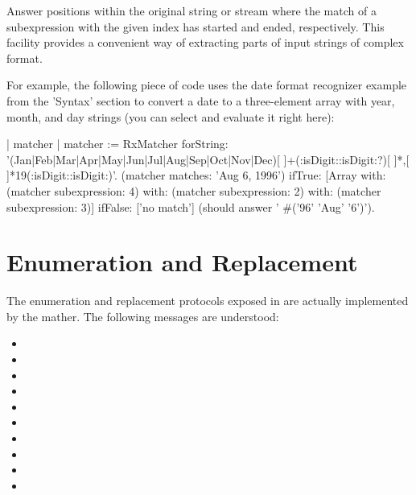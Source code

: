 \documentclass[a4paper,10pt,twoside]{book}
\begin{document}
{\begin{description}
\item {} Answer positions within the original string or stream where the 	match of a subexpression with the given index has started and ended, respectively. This facility provides a convenient way of extracting parts of input strings of complex format. 
\end{description}




For example, the following piece of code uses the  date format recognizer example from the 'Syntax' section to convert a date to a three-element array with year, month, and day strings (you can select and evaluate it right here): 	

\begin{code}{}
| matcher | 	
matcher := RxMatcher forString:  '(Jan|Feb|Mar|Apr|May|Jun|Jul|Aug|Sep|Oct|Nov|Dec)[ ]+(:isDigit::isDigit:?)[ ]*,[ ]*19(:isDigit::isDigit:)'. 	
(matcher matches: 'Aug 6, 1996') 		
       ifTrue: [Array 
                       with: (matcher subexpression: 4) 	with: (matcher subexpression: 2) 				with: (matcher subexpression: 3)] 		
        ifFalse: ['no match'] (should answer ' #('96' 'Aug' '6')'). 	
\end{code}        
        


        
\section{Enumeration and Replacement}

 The enumeration and replacement protocols exposed in  are actually implemented by the mather.  The following messages are understood: 
 
 \begin{itemize}
\item {} 	
\item {} 	
\item {} 	
\item {}
\item {} 	
\item {} 	
\item {} 
\item {} 	
\item {}
\item {} 
\end{itemize}	
	
}
\end{document}
